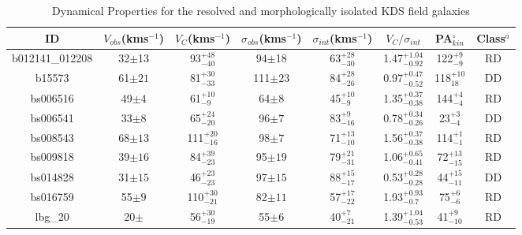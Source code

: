 \documentclass[fleqn,usenatbib]{mn2e}
\begin{document}
\begin{table*}
\centering
\begin{threeparttable}
\caption{Dynamical Properties for the resolved and morphologically isolated KDS field galaxies}
\label{tab:kin_props}
\begin{tabular}{cccccccc}

 \hline
ID & $V_{obs}$(kms$^{-1}$) & $V_{C}$(kms$^{-1}$) & $\sigma_{obs}$(kms$^{-1}$) & $\sigma_{int}$(kms$^{-1}$) & $V_{C}/\sigma_{int}$ & PA$_{kin}^{\circ}$ & Class$^{a}$ \\
 \hline
b012141\_012208 & 32$\pm$13                    & 93$^{+48}_{-40}$                     & 94$\pm$18                 & 63$^{+28}_{-30}$                 & 1.47$^{+1.04}_{-0.92}$             & 122$^{+9}_{-9}$ & RD   \\
b15573          & 61$\pm21$                    & 81$^{+30}_{-33}$                     & 111$\pm23$                 & 84$^{+28}_{-26}$          & 0.97$^{+0.47}_{-0.52}$            & 118$^{+10}_{18}$ & DD   \\
bs006516        & 49$\pm4$                    & 61$^{+10}_{-9}$                     & 64$\pm8$                  & 45$^{+10}_{-9}$              & 1.35$^{+0.37}_{-0.38}$         & 144$^{+4}_{-4}$ & RD   \\
bs006541        & 33$\pm8$         & 65$^{+24}_{-20}$          & 96$\pm7$                  & 83$^{+9}_{-16}$             & 0.78$^{+0.34}_{-0.26}$          & 23$^{+3}_{-4}$ & DD    \\
bs008543        & 68$\pm13$                    & 111$^{+20}_{-16}$                    & 98$\pm7$                  & 71$^{+13}_{-10}$         & 1.56$^{+0.37}_{-0.38}$                & 114$^{+1}_{-1}$  & RD  \\
bs009818        & 39$\pm16$                    & 84$^{+39}_{-23}$                     & 95$\pm19$                  & 79$^{+21}_{-31}$       & 1.06$^{+0.65}_{-0.41}$                   & 72$^{+13}_{-15}$ & RD    \\
bs014828        & 31$\pm15$                    & 46$^{+23}_{-23}$                     & 97$\pm15$                  & 88$^{+15}_{-17}$      & 0.53$^{+0.28}_{-0.28}$               & 44$^{+15}_{-11}$  & DD  \\
bs016759        & 55$\pm9$                    & 110$^{+30}_{-21}$                    & 82$\pm11$                  & 57$^{+17}_{-22}$         & 1.93$^{+0.93}_{-0.7}$               & 75$^{+6}_{-6}$ & RD    \\
lbg\_20         & 20$\pm$                    & 56$^{+30}_{-19}$                     & 55$\pm6$                  & 40$^{+7}_{-21}$         & 1.39$^{+1.04}_{-0.53}$              & 41$^{+9}_{-10}$ & RD   \\

\end{tabular}
\end{threeparttable}
\end{table*}
\end{document}
